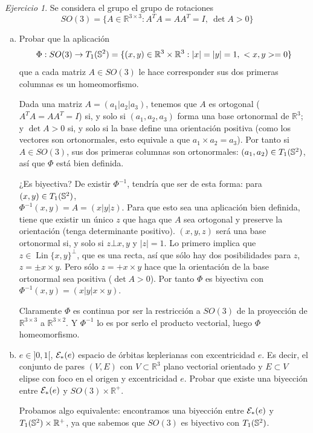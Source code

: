 \documentclass[12pt,spanish]{article}
\theoremstyle{definition}
\theoremstyle{remark}
\newtheorem{exercise}{Ejercicio}
\newcommand{\R}{\mathbb{R}}
\begin{document}
\newpage
\begin{exercise}

  Se considera el grupo el grupo de rotaciones
  \[SO(3)=\{A\in\R^{3\times 3}:A^T A=AA^T=I,\ \det A>0\}\]

  \begin{enumerate}[a)]
  \item Probar que la aplicación
    \[\Phi:SO(3)\rightarrow \T=\{(x,y)\in\R^3\times\R^3:|x|=|y|=1,\
      <x,y>=0\}\] que a cada matriz $A\in SO(3)$ le hace corresponder
    sus dos primeras columnas es un homeomorfismo.

    Dada una matriz $A=(a_1|a_2|a_3)$, tenemos que $A$ es ortogonal
    ($A^T A=AA^T=I$) si, y solo si $(a_1,a_2,a_3)$ forma una base
    ortonormal de $\R^3$; y $\det A>0$ si, y solo si la base define
    una orientación positiva (como los vectores son ortonormales, esto
    equivale a que $a_1\times a_2=a_3$). Por tanto si $A\in SO(3)$,
    sus dos primeras columnas son ortonormales: $(a_1,a_2)\in T_1(\mathbb{S}^2)$, así
    que $\Phi$ está bien definida.

    ¿Es biyectiva? De existir $\Phi^{-1}$, tendría que ser de esta
    forma: para $(x,y)\in T_1(\mathbb{S}^2)$, \\ $\Phi^{-1}(x,y)=A=(x|y|z)$. Para que
    esto sea una aplicación bien definida, tiene que existir un único
    $z$ que haga que $A$ sea ortogonal y preserve la orientación
    (tenga determinante positivo). $(x,y,z)$ será una base ortonormal
    si, y solo si $z\bot x,y$ y $|z|=1$. Lo primero implica que
    $z\in \operatorname{Lin}\{x,y\}^\bot$, que es una recta, así que
    sólo hay dos posibilidades para $z$, $z=\pm x\times y$. Pero sólo
    $z=+x\times y$ hace que la orientación de la base ortonormal
    sea positiva ($\det A>0$). Por tanto $\Phi$ es biyectiva con \\
    $\Phi^{-1}(x,y)=(x|y|x\times y)$.

    Claramente $\Phi$ es continua por ser la restricción a $SO(3)$ de
    la proyección de $\R^{3\times 3}$ a $\R^{3\times 2}$. Y
    $\Phi^{-1}$ lo es por serlo el producto vectorial, luego
    $\Phi$ homeomorfismo.

  \item $e\in]0,1[$, $\mathcal{E}_*(e)$ espacio de órbitas keplerianas con
    excentricidad $e$. Es decir, el conjunto de pares $(V,E)$ con
    $V\subset\R^3$ plano vectorial orientado y $E\subset V$ elipse con
    foco en el origen y excentricidad $e$. Probar que existe una
    biyección entre $\mathcal{E}_*(e)$ y $SO(3)\times\R^+$.

    Probamos algo equivalente: encontramos una biyección entre $\mathcal{E}_*(e)$ y
    $\T\times\R^+$, ya que sabemos que $SO(3)$ es biyectivo con $T_1(\mathbb{S}^2)$.


\end{enumerate}
\end{exercise}
\end{document}
